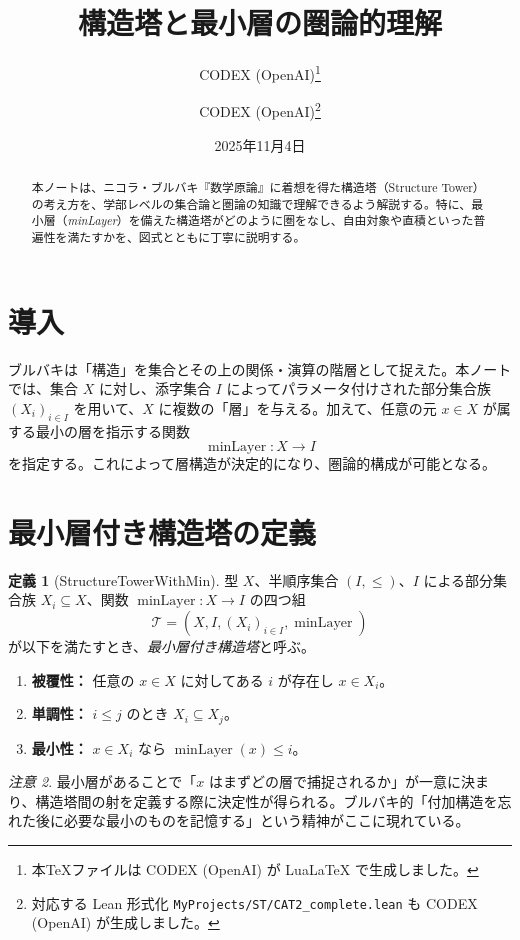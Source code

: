 \documentclass[a4paper]{ltjsarticle}
\title{構造塔と最小層の圏論的理解}
\author{CODEX (OpenAI)\thanks{本TeXファイルは CODEX (OpenAI) が Lua\LaTeX{} で生成しました。} \and CODEX (OpenAI)\thanks{対応する Lean 形式化 \texttt{MyProjects/ST/CAT2\_complete.lean} も CODEX (OpenAI) が生成しました。}}
\date{2025年11月4日}
\theoremstyle{definition}
\newtheorem{definition}{定義}[section]
\theoremstyle{plain}
\theoremstyle{remark}
\newtheorem{remark}[definition]{注意}
\begin{document}
\maketitle

\begin{abstract}
本ノートは、ニコラ・ブルバキ『数学原論』に着想を得た構造塔（Structure Tower）の考え方を、学部レベルの集合論と圏論の知識で理解できるよう解説する。特に、最小層（\emph{minLayer}）を備えた構造塔がどのように圏をなし、自由対象や直積といった普遍性を満たすかを、図式とともに丁寧に説明する。
\end{abstract}

\tableofcontents

\section{導入}
ブルバキは「構造」を集合とその上の関係・演算の階層として捉えた。本ノートでは、集合 $X$ に対し、添字集合 $I$ によってパラメータ付けされた部分集合族 $(X_i)_{i\in I}$ を用いて、$X$ に複数の「層」を与える。加えて、任意の元 $x\in X$ が属する最小の層を指示する関数
\[
  \operatorname{minLayer} \colon X \to I
\]
を指定する。これによって層構造が決定的になり、圏論的構成が可能となる。

\section{最小層付き構造塔の定義}
\begin{definition}[StructureTowerWithMin]
型 $X$、半順序集合 $(I,\leq)$、$I$ による部分集合族 $X_i\subseteq X$、関数 $\operatorname{minLayer}\colon X\to I$ の四つ組
\[
  \mathcal{T} = (X, I, (X_i)_{i\in I}, \operatorname{minLayer})
\]
が以下を満たすとき、\emph{最小層付き構造塔}と呼ぶ。
\begin{enumerate}
  \item \textbf{被覆性：} 任意の $x\in X$ に対してある $i$ が存在し $x\in X_i$。
  \item \textbf{単調性：} $i\leq j$ のとき $X_i\subseteq X_j$。
  \item \textbf{最小性：} $x\in X_i$ なら $\operatorname{minLayer}(x)\leq i$。
\end{enumerate}
\end{definition}

\begin{remark}
最小層があることで「$x$ はまずどの層で捕捉されるか」が一意に決まり、構造塔間の射を定義する際に決定性が得られる。ブルバキ的「付加構造を忘れた後に必要な最小のものを記憶する」という精神がここに現れている。
\end{remark}
\end{document}
